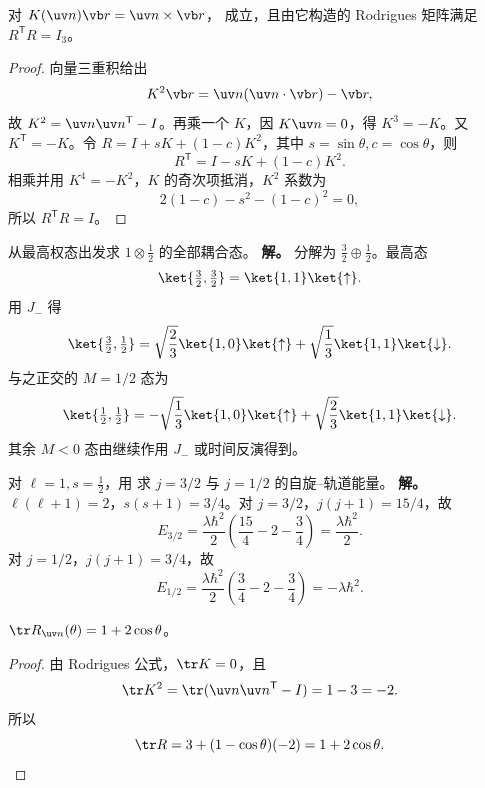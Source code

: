 \begin{proposition}
对 $K(\uv n)\vb r=\uv n\times\vb r$， 成立，且由它构造的 Rodrigues 矩阵满足 $R^{\mathsf T}R=I_3$。
\end{proposition}

\begin{proof}
向量三重积给出
\[
K^2\vb r=\uv n(\uv n\cdot\vb r)-\vb r,
\]
故 $K^2=\uv n\uv n^{\mathsf T}-I$。再乘一个 $K$，因 $K\uv n=0$，得 $K^3=-K$。又 $K^{\mathsf T}=-K$。令 $R=I+sK+(1-c)K^2$，其中 $s=\sin\theta,c=\cos\theta$，则
\[
R^{\mathsf T}=I-sK+(1-c)K^2.
\]
相乘并用 $K^4=-K^2$，$K$ 的奇次项抵消，$K^2$ 系数为
\[
2(1-c)-s^2-(1-c)^2=0,
\]
所以 $R^{\mathsf T}R=I$。
\end{proof}


\begin{workedexample}
从最高权态出发求 $1\otimes\tfrac12$ 的全部耦合态。
\textbf{解。} 分解为 $\frac32\oplus\frac12$。最高态
\[
\ket{\tfrac32,\tfrac32}=\ket{1,1}\ket{\uparrow}.
\]
用 $J_-$ 得
\[
\ket{\tfrac32,\tfrac12}
=\sqrt{\frac23}\ket{1,0}\ket{\uparrow}
+\sqrt{\frac13}\ket{1,1}\ket{\downarrow}.
\]
与之正交的 $M=1/2$ 态为
\[
\ket{\tfrac12,\tfrac12}
=-\sqrt{\frac13}\ket{1,0}\ket{\uparrow}
+\sqrt{\frac23}\ket{1,1}\ket{\downarrow}.
\]
其余 $M<0$ 态由继续作用 $J_-$ 或时间反演得到。
\end{workedexample}


\begin{workedexample}
对 $\ell=1,s=\tfrac12$，用  求 $j=3/2$ 与 $j=1/2$ 的自旋--轨道能量。
\textbf{解。} $\ell(\ell+1)=2$，$s(s+1)=3/4$。对 $j=3/2$，$j(j+1)=15/4$，故
\[
E_{3/2}=\frac{\lambda\hbar^2}{2}\left(\frac{15}{4}-2-\frac34\right)
=\frac{\lambda\hbar^2}{2}.
\]
对 $j=1/2$，$j(j+1)=3/4$，故
\[
E_{1/2}=\frac{\lambda\hbar^2}{2}\left(\frac34-2-\frac34\right)
=-\lambda\hbar^2.
\]
\end{workedexample}


\begin{proposition}
 $\tr R_{\uv n}(\theta)=1+2\cos\theta$。
\end{proposition}

\begin{proof}
由 Rodrigues 公式，$\tr K=0$，且
\[
\tr K^2=\tr(\uv n\uv n^{\mathsf T}-I)=1-3=-2.
\]
所以
\[
\tr R=3+(1-\cos\theta)(-2)=1+2\cos\theta.
\]
\end{proof}


